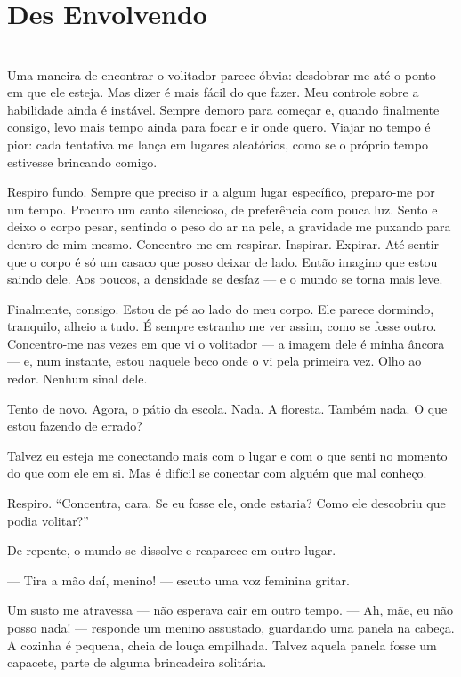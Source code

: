 \newpage

\ifdefined\useChapters
\chapter{Des Envolvendo}
\else
\chapter{}
\fi

Uma maneira de encontrar o volitador parece óbvia: desdobrar-me até o ponto em que ele esteja.  
Mas dizer é mais fácil do que fazer.  
Meu controle sobre a habilidade ainda é instável. Sempre demoro para começar e, quando finalmente consigo, levo mais tempo ainda para focar e ir onde quero. Viajar no tempo é pior: cada tentativa me lança em lugares aleatórios, como se o próprio tempo estivesse brincando comigo.

Respiro fundo.  
Sempre que preciso ir a algum lugar específico, preparo-me por um tempo.  
Procuro um canto silencioso, de preferência com pouca luz.  
Sento e deixo o corpo pesar, sentindo o peso do ar na pele, a gravidade me puxando para dentro de mim mesmo.  
Concentro-me em respirar.  
Inspirar. Expirar.  
Até sentir que o corpo é só um casaco que posso deixar de lado.  
Então imagino que estou saindo dele.  
Aos poucos, a densidade se desfaz — e o mundo se torna mais leve.  

Finalmente, consigo.  
Estou de pé ao lado do meu corpo. Ele parece dormindo, tranquilo, alheio a tudo.  
É sempre estranho me ver assim, como se fosse outro.  
Concentro-me nas vezes em que vi o volitador — a imagem dele é minha âncora — e, num instante, estou naquele beco onde o vi pela primeira vez.  
Olho ao redor. Nenhum sinal dele.

Tento de novo.  
Agora, o pátio da escola.  
Nada.  
A floresta.  
Também nada.  
O que estou fazendo de errado?

Talvez eu esteja me conectando mais com o lugar e com o que senti no momento do que com ele em si.  
Mas é difícil se conectar com alguém que mal conheço.

Respiro.  
“Concentra, cara. Se eu fosse ele, onde estaria? Como ele descobriu que podia volitar?”

De repente, o mundo se dissolve e reaparece em outro lugar.

— Tira a mão daí, menino! — escuto uma voz feminina gritar.

Um susto me atravessa — não esperava cair em outro tempo.  
— Ah, mãe, eu não posso nada! — responde um menino assustado, guardando uma panela na cabeça.  
A cozinha é pequena, cheia de louça empilhada.  
Talvez aquela panela fosse um capacete, parte de alguma brincadeira solitária.

